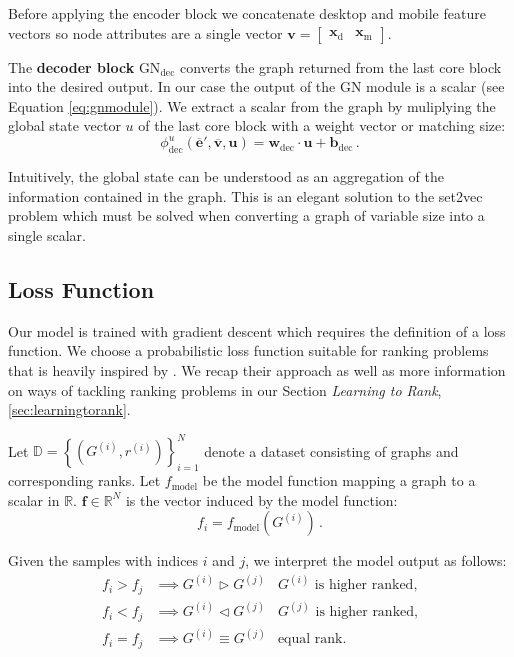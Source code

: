 Before applying the encoder block we concatenate desktop and mobile feature vectors so node attributes are a single vector $\bm{v}=\begin{bmatrix}\bm{x}_\text{d} & \bm{x}_\text{m}\end{bmatrix}$.

The \textbf{decoder block} $\text{GN}_\text{dec}$ converts the graph returned from the last core block into the desired output. In our case the output of the GN module is a scalar (see Equation \ref{eq:gnmodule}). We extract a scalar from the graph by muliplying the global state vector $u$ of the last core block with a weight vector or matching size:
\begin{equation}
    \phi^u_\text{dec}\left(\bm{\overline{e}}',\bm{\overline{v}},\bm{u}\right)=\bm{w}_\text{dec}\cdot\bm{u}+\bm{b}_\text{dec}\,.
\end{equation}

Intuitively, the global state can be understood as an aggregation of the information contained in the graph. This is an elegant solution to the set2vec problem which must be solved when converting a graph of variable size into a single scalar.

\subsection{Loss Function}

Our model is trained with gradient descent which requires the definition of a loss function. We choose a probabilistic loss function suitable for ranking problems that is heavily inspired by \cite{Burges:learningtorankwithsgd}. We recap their approach as well as more information on ways of tackling ranking problems in our Section \textit{Learning to Rank}, \ref{sec:learningtorank}.

Let $\mathbb{D}=\left\{\left(G^{(i)},r^{(i)}\right)\right\}_{i=1}^N$ denote a dataset consisting of graphs and corresponding ranks. Let $f_\text{model}$ be the model function mapping a graph to a scalar in $\mathbb{R}$. $\bm{f}\in\mathbb{R}^N$ is the vector induced by the model function:
\begin{equation}
    f_i=f_\text{model}\left(G^{(i)}\right)\,.
\end{equation}

Given the samples with indices $i$ and $j$, we interpret the model output as follows:
\begin{align}
    f_i>f_j&\implies G^{(i)}\triangleright G^{(j)}&G^{(i)}\text{ is higher ranked,}\\
    f_i<f_j&\implies G^{(i)}\triangleleft G^{(j)}&G^{(j)}\text{ is higher ranked,}\\
    f_i=f_j&\implies G^{(i)}\equiv G^{(j)}&\text{equal rank.}
\end{align}

